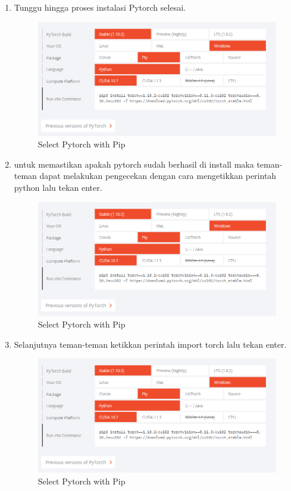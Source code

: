 \begin{enumerate}
\item Tunggu hingga proses instalasi Pytorch selesai.
\begin{figure}[H]
\centering
\includegraphics[scale=.35]{figures/pytorch2}
\caption{Select Pytorch with Pip}
\label{pytorch2}
\end{figure}

\item untuk memastikan apakah pytorch sudah berhasil di install maka teman-teman dapat melakukan pengecekan dengan cara mengetikkan perintah python lalu tekan enter.
\begin{figure}[H]
\centering
\includegraphics[scale=.35]{figures/pytorch2}
\caption{Select Pytorch with Pip}
\label{pytorch2}
\end{figure}

\item Selanjutnya teman-teman ketikkan perintah import torch lalu tekan enter.
\begin{figure}[H]
\centering
\includegraphics[scale=.35]{figures/pytorch2}
\caption{Select Pytorch with Pip}
\label{pytorch2}
\end{figure}


\end{enumerate}

